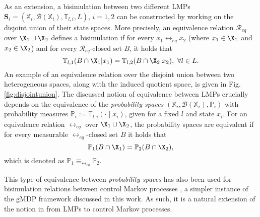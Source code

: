 \documentclass[letterpaper, 10 pt, conference]{amsart}
\theoremstyle{definition}
\theoremstyle{example}
\theoremstyle{remark}
\begin{document}
As an extension, a bisimulation between two different LMPs $\mathbf S_i=(\mathbb X_i,\mathcal B(\mathbb X_i ),\mathbb T_{l,i},L)$, $i=1,2$ 
can be constructed by working on the disjoint union of their state spaces. More precisely,   
an equivalence relation $\mathcal R_{eq}$ over $\X_1\sqcup \X_2$ defines a bisimulation if for every $x_1\rel_{eq}x_2$ (where $x_1\in \X_1$ and $x_2\in\X_2$) 
and for every $\mathcal R_{eq}$-closed set $B$, 
it holds that 
\[\mathbb T_{l,1}(B\cap \X_1|x_1)=\mathbb T_{l,2}(B\cap \X_2 |x_2),\  \forall l\in L.\]
An example of an equivalence relation over the disjoint union between two heterogeneous spaces, 
along with the induced quotient space, is given in Fig. \ref{fig:disjointunion}.  
The discussed notion of equivalence between LMPs crucially depends on the equivalence of the \emph{probability spaces} $(\mathbb X_i,\mathcal B(\mathbb X_i ),\mathbb P_i)$ with probability measures $\mathbb P_i:=\mathbb T_{l,i}(\cdot\mid x_i)$, given for a fixed $l$ and state $x_i$. 
For an equivalence relation $\rel_{eq}$ over $\X_1\sqcup\X_2$, 
the probability spaces are equivalent if for every measurable $\rel_{eq}$-closed set $B$ it holds that 
\[\mathbb P_1(B\cap \X_1)=\mathbb P_2 (B\cap \X_2),\] 
which is denoted as $\mathbb P_1\equiv_{\rel_{eq}}\mathbb P_2$. 

This type of equivalence between \emph{probability spaces} has also been used for bisimulation relations between 
control Markov processes 
\cite{Abate2011}, a simpler instance of the gMDP framework discussed in this work.  
As such, it is a natural extension of the notion in \cite{Desharnais2002,Desharnais2003} from LMPs to control Markov processes. 
\end{document}
